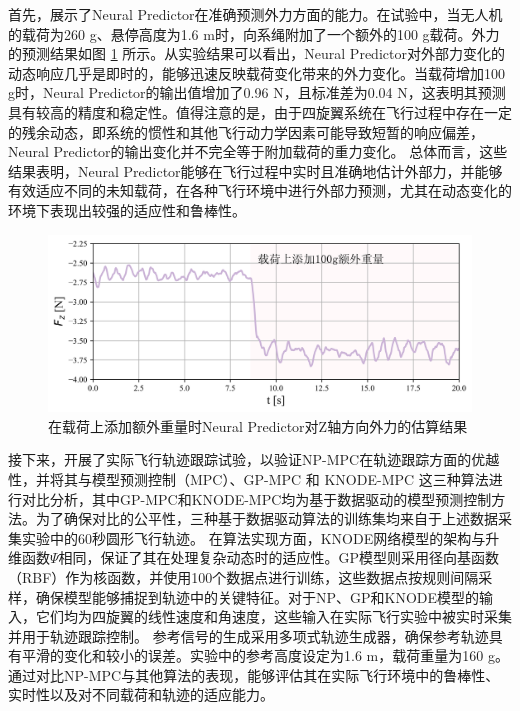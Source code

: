 \documentclass[lang=chs, degree=master, blindreview=false, winfonts=true]{yanputhesis}
\begin{document}
首先，展示了Neural Predictor在准确预测外力方面的能力。在试验中，当无人机的载荷为260 g、悬停高度为1.6 m时，向系绳附加了一个额外的100 g载荷。外力的预测结果如图 \ref{force} 所示。从实验结果可以看出，Neural Predictor对外部力变化的动态响应几乎是即时的，能够迅速反映载荷变化带来的外力变化。当载荷增加100 g时，Neural Predictor的输出值增加了0.96 N，且标准差为0.04 N，这表明其预测具有较高的精度和稳定性。值得注意的是，由于四旋翼系统在飞行过程中存在一定的残余动态，即系统的惯性和其他飞行动力学因素可能导致短暂的响应偏差，Neural Predictor的输出变化并不完全等于附加载荷的重力变化。
总体而言，这些结果表明，Neural Predictor能够在飞行过程中实时且准确地估计外部力，并能够有效适应不同的未知载荷，在各种飞行环境中进行外部力预测，尤其在动态变化的环境下表现出较强的适应性和鲁棒性。



\begin{figure}[hbt!]
	\centering
	\includegraphics[width=38pc]{picture/kk/force.png} 
	\caption{在载荷上添加额外重量时Neural Predictor对Z轴方向外力的估算结果} 
	\label{force}
\end{figure}

接下来，开展了实际飞行轨迹跟踪试验，以验证NP-MPC在轨迹跟踪方面的优越性，并将其与模型预测控制（MPC）、GP-MPC \cite{torrente2021data} 和 KNODE-MPC \cite{Chee2022} 这三种算法进行对比分析，其中GP-MPC和KNODE-MPC均为基于数据驱动的模型预测控制方法。为了确保对比的公平性，三种基于数据驱动算法的训练集均来自于上述数据采集实验中的60秒圆形飞行轨迹。
在算法实现方面，KNODE网络模型的架构与升维函数$\Psi$相同，保证了其在处理复杂动态时的适应性。GP模型则采用径向基函数（RBF）作为核函数，并使用100个数据点进行训练，这些数据点按规则间隔采样，确保模型能够捕捉到轨迹中的关键特征。对于NP、GP和KNODE模型的输入，它们均为四旋翼的线性速度和角速度，这些输入在实际飞行实验中被实时采集并用于轨迹跟踪控制。
参考信号的生成采用多项式轨迹生成器，确保参考轨迹具有平滑的变化和较小的误差。实验中的参考高度设定为1.6 m，载荷重量为160 g。通过对比NP-MPC与其他算法的表现，能够评估其在实际飞行环境中的鲁棒性、实时性以及对不同载荷和轨迹的适应能力。
\end{document}
